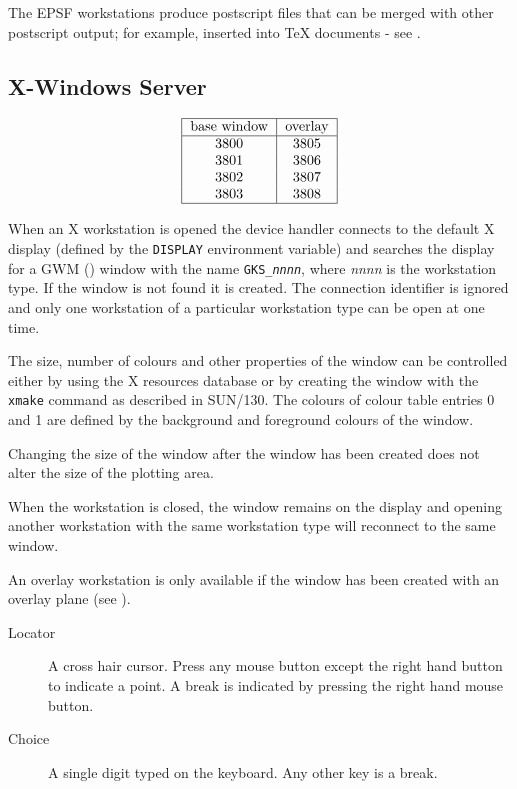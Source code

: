 \documentclass[11pt,nolof]{starlink}
\begin{document}
The EPSF workstations produce postscript files that can be merged with other
postscript output; for example, inserted into TeX documents - see
.

\subsection{X-Windows Server}
\label{xwin}


\[\begin{tabular}{|c|c|}\hline
base window &overlay\\\hline
3800 &3805 \\
3801 &3806 \\
3802 &3807 \\
3803 &3808 \\\hline
\end{tabular}\]


When an X workstation is opened the device handler connects to the
default X display (defined by the \texttt{DISPLAY} environment variable)
and searches the display for a GWM
() window
with the name \texttt{GKS\_{\em{nnnn}}},
where \emph{nnnn} is the workstation type. If the window is
not found it is created. The connection
identifier is ignored and only one workstation of a particular
workstation type can be open at one time.

The size, number of colours and other properties of the window can be
controlled either by using the X resources database or by creating the
window with the \texttt{xmake} command as described in SUN/130. The colours
of colour table entries 0 and 1 are defined by the background and
foreground colours of the window.

Changing the size of the window after the window has been created does
not alter the size of the plotting area.

When the workstation is closed, the window remains on the display and
opening another workstation with the same workstation type will
reconnect to the same window.

An overlay workstation is only available if the window has been created
with an overlay plane (see ).


\begin{description}
\item[Locator] A cross hair cursor.
Press any mouse button except the right hand button to indicate a point. A
break is indicated by pressing the right hand mouse button.
\item[Choice] A single digit typed on the keyboard.
Any other key is a break.
\end{description}
\end{document}
